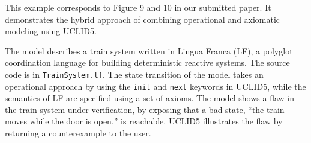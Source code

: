 This example corresponds to Figure 9 and 10 in our submitted paper. It demonstrates the hybrid approach of combining operational and axiomatic modeling using UCLID5.

The model describes a train system written in Lingua Franca (LF), a polyglot coordination language for building deterministic reactive systems. The source code is in \texttt{TrainSystem.lf}. The state transition of the model takes an operational approach by using the \texttt{init} and \texttt{next} keywords in UCLID5, while the semantics of LF are specified using a set of axioms. The model shows a flaw in the train system under verification, by exposing that a bad state, ``the train moves while the door is open,'' is reachable. UCLID5 illustrates the flaw by returning a counterexample to the user.